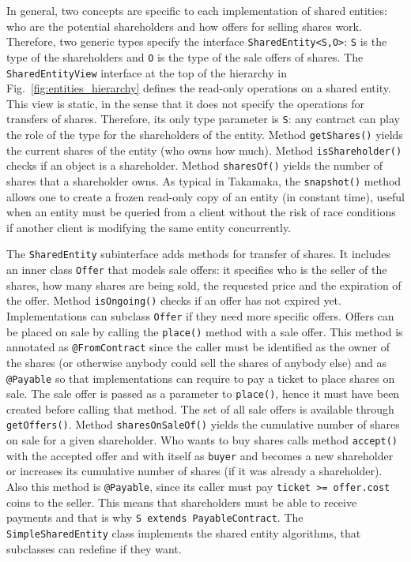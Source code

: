 In general, two concepts are specific to each implementation of shared entities:
who are the potential shareholders and how offers for selling shares work.
Therefore, two generic types specify the interface \texttt{SharedEntity<S,O>}:
\texttt{S} is the type of the shareholders and \texttt{O} is the type of the sale offers of shares.
The \texttt{SharedEntityView}
interface at the top of the hierarchy in Fig.~\ref{fig:entities_hierarchy} defines
the read-only operations on a shared entity. This view is static, in the sense
that it does not specify the operations for transfers of shares. Therefore, its
only type parameter is \texttt{S}: any contract can play the role of the type for the
shareholders of the entity. Method \texttt{getShares()} yields the current
shares of the entity (who owns how much).
Method \texttt{isShareholder()} checks if an object is a shareholder. Method
\texttt{sharesOf()} yields the number of shares that a shareholder owns. As typical in Takamaka,
the \texttt{snapshot()}
method allows one to create a frozen read-only copy of an entity
(in constant time), useful when an entity must be queried from a client without
the risk of race conditions if another client is modifying the same entity concurrently.

The \texttt{SharedEntity} subinterface adds methods for transfer of shares.
It includes an inner class \texttt{Offer}
that models sale offers: it specifies
who is the seller of the shares, how many shares are being sold, the requested
price and the expiration of the offer. Method \texttt{isOngoing()} checks if an offer has
not expired yet. Implementations can subclass \texttt{Offer} if they need more specific
offers. Offers can be placed on sale by calling the \texttt{place()} method with a sale
offer. This method is annotated as \texttt{@FromContract} since the caller must be
identified as the owner of the shares
(or otherwise anybody could sell the shares of anybody else) and as
\texttt{@Payable} so that implementations can require to pay a ticket to place shares on
sale. The sale offer is passed as a parameter to \texttt{place()}, hence it must have been
created before calling that method. The set of all sale offers is available through
\texttt{getOffers()}. Method \texttt{sharesOnSaleOf()} yields the cumulative number of shares on
sale for a given shareholder. Who wants to buy shares calls method \texttt{accept()} with
the accepted offer and with itself as \texttt{buyer}
and becomes a new shareholder or increases its cumulative number of shares
(if it was already a shareholder). Also this method is \texttt{@Payable}, since its caller
must pay \texttt{ticket >= offer.cost} coins to the seller. This means that shareholders
must be able to receive payments and that is why \texttt{S extends PayableContract}.
The \texttt{SimpleSharedEntity}
class implements the shared entity algorithms, that subclasses can redefine if they want.

